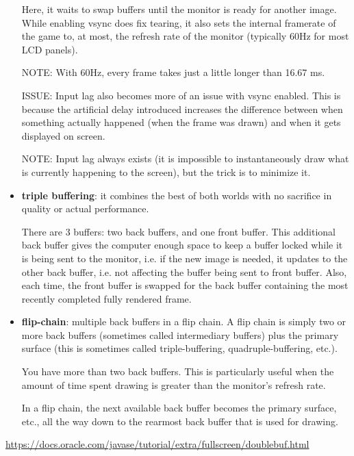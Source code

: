 \begin{itemize}
Here, it waits to swap buffers until the monitor is ready for another image.
While enabling vsync does fix tearing, it also sets the internal framerate of
the game to, at most, the refresh rate of the monitor (typically 60Hz for most
LCD panels).

NOTE: With 60Hz, every frame takes just a little longer than 16.67 ms.

ISSUE: Input lag also becomes more of an issue with vsync enabled. This is
because the artificial delay introduced increases the difference between when something
 actually happened (when the frame was drawn) and when it gets displayed on
 screen.
 
NOTE: Input lag always exists (it is impossible to instantaneously draw what is
currently happening to the screen), but the trick is to minimize it.
  
   \item {\bf triple buffering}: it combines the best of both worlds with no
   sacrifice in quality or actual performance.
   
   
 There are 3 buffers: two back buffers, and one front buffer. This additional
 back buffer gives the computer enough space to keep a buffer locked while it is
 being sent to the monitor, i.e. if the new image is needed, it updates to the
 other back buffer, i.e. not affecting the buffer being sent to front buffer.
 Also, each time, the  front buffer is swapped for the back buffer containing
 the most recently completed fully rendered frame.
 
   \item {\bf flip-chain}:  multiple back buffers in a flip chain. A flip chain
   is simply two or more back buffers (sometimes called intermediary buffers)
   plus the primary surface (this is sometimes called triple-buffering,
   quadruple-buffering, etc.).   
   
 You have more than two back buffers. This is particularly useful when the
 amount of time spent drawing is greater than the monitor's refresh rate. 
 
In a flip chain, the next available back buffer becomes the primary surface,
 etc., all the way down to the rearmost back buffer that is used for drawing.
\end{itemize}
\url{https://docs.oracle.com/javase/tutorial/extra/fullscreen/doublebuf.html}


